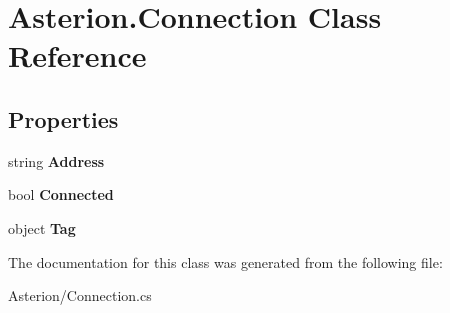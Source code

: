 \hypertarget{classAsterion_1_1Connection}{\section{Asterion.\-Connection Class Reference}
\label{classAsterion_1_1Connection}
}
\subsection*{Properties}
\begin{DoxyCompactItemize}
\item 
\hypertarget{classAsterion_1_1Connection_a50c46ca25fa66f0d153be4f4bea5276c}{string {\bfseries Address}}\label{classAsterion_1_1Connection_a50c46ca25fa66f0d153be4f4bea5276c}

\item 
\hypertarget{classAsterion_1_1Connection_a1d1362c9551443408aa044531324206a}{bool {\bfseries Connected}}\label{classAsterion_1_1Connection_a1d1362c9551443408aa044531324206a}

\item 
\hypertarget{classAsterion_1_1Connection_adc6eddd84fa0b10b7b9dc7cc94b1f95a}{object {\bfseries Tag}}\label{classAsterion_1_1Connection_adc6eddd84fa0b10b7b9dc7cc94b1f95a}

\end{DoxyCompactItemize}


The documentation for this class was generated from the following file\-:\begin{DoxyCompactItemize}
\item 
Asterion/Connection.\-cs\end{DoxyCompactItemize}
